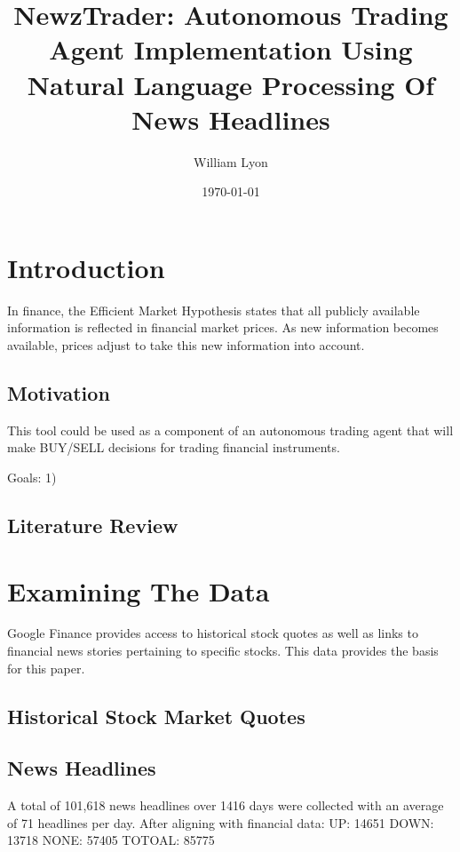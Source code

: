 \documentclass[twocolumn]{article}
\begin{document}
\title{NewzTrader: Autonomous Trading Agent Implementation Using Natural Language Processing Of News Headlines}
\author{William Lyon}
\date{\today}
\maketitle


\section{Introduction}
In finance, the Efficient Market Hypothesis states that all publicly available information is reflected in financial market prices.  As new information becomes available, prices adjust to take this new information into account.  
\subsection{Motivation}
This tool could be used as a component of an autonomous trading agent that will make BUY/SELL decisions for trading financial instruments.

Goals: 1) 
\subsection{Literature Review}

\section{Examining The Data}
Google Finance provides access to historical stock quotes as well as links to financial news stories pertaining to specific stocks. This data provides the basis for this paper.
\subsection{Historical Stock Market Quotes}
\subsection{News Headlines}
A total of 101,618 news headlines over 1416 days were collected with an average of 71 headlines per day.  After aligning with financial data:
UP: 14651
DOWN: 13718
NONE: 57405
TOTOAL: 85775
\end{document}
